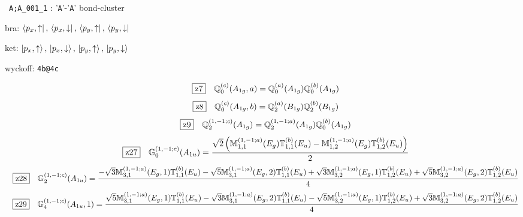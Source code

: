 \documentclass[fleqn,10pt,landscape]{jsarticle}
\begin{document}
\noindent\textbullet\, \texttt{A;A_001_1} : '\texttt{A}'-'\texttt{A}' bond-cluster

\noindent\quad * bra: $\bra{p_{x},\uparrow},\, \bra{p_{x},\downarrow},\, \bra{p_{y},\uparrow},\, \bra{p_{y},\downarrow}$

\noindent\quad * ket: $\ket{p_{x},\uparrow},\, \ket{p_{x},\downarrow},\, \ket{p_{y},\uparrow},\, \ket{p_{y},\downarrow}$

\noindent\quad * wyckoff: \texttt{4b@4c}

\begin{dmath*}
\hspace*{3mm}\fbox{z7}\quad \mathbb{Q}_{0}^{(c)}(A_{1g},a)=\mathbb{Q}_{0}^{(a)}(A_{1g}) \mathbb{Q}_{0}^{(b)}(A_{1g})
\end{dmath*}
\begin{dmath*}
\hspace*{3mm}\fbox{z8}\quad \mathbb{Q}_{0}^{(c)}(A_{1g},b)=\mathbb{Q}_{2}^{(a)}(B_{1g}) \mathbb{Q}_{2}^{(b)}(B_{1g})
\end{dmath*}
\begin{dmath*}
\hspace*{3mm}\fbox{z9}\quad \mathbb{Q}_{2}^{(1,-1;c)}(A_{1g})=\mathbb{Q}_{2}^{(1,-1;a)}(A_{1g}) \mathbb{Q}_{0}^{(b)}(A_{1g})
\end{dmath*}
\begin{dmath*}
\hspace*{3mm}\fbox{z27}\quad \mathbb{G}_{0}^{(1,-1;c)}(A_{1u})=\frac{\sqrt{2} \left(\mathbb{M}_{1,1}^{(1,-1;a)}(E_{g}) \mathbb{T}_{1,1}^{(b)}(E_{u}) - \mathbb{M}_{1,2}^{(1,-1;a)}(E_{g}) \mathbb{T}_{1,2}^{(b)}(E_{u})\right)}{2}
\end{dmath*}
\begin{dmath*}
\hspace*{3mm}\fbox{z28}\quad \mathbb{G}_{2}^{(1,-1;c)}(A_{1u})=\frac{- \sqrt{3} \mathbb{M}_{3,1}^{(1,-1;a)}(E_{g},1) \mathbb{T}_{1,1}^{(b)}(E_{u}) - \sqrt{5} \mathbb{M}_{3,1}^{(1,-1;a)}(E_{g},2) \mathbb{T}_{1,1}^{(b)}(E_{u}) + \sqrt{3} \mathbb{M}_{3,2}^{(1,-1;a)}(E_{g},1) \mathbb{T}_{1,2}^{(b)}(E_{u}) + \sqrt{5} \mathbb{M}_{3,2}^{(1,-1;a)}(E_{g},2) \mathbb{T}_{1,2}^{(b)}(E_{u})}{4}
\end{dmath*}
\begin{dmath*}
\hspace*{3mm}\fbox{z29}\quad \mathbb{G}_{4}^{(1,-1;c)}(A_{1u},1)=\frac{\sqrt{5} \mathbb{M}_{3,1}^{(1,-1;a)}(E_{g},1) \mathbb{T}_{1,1}^{(b)}(E_{u}) - \sqrt{3} \mathbb{M}_{3,1}^{(1,-1;a)}(E_{g},2) \mathbb{T}_{1,1}^{(b)}(E_{u}) - \sqrt{5} \mathbb{M}_{3,2}^{(1,-1;a)}(E_{g},1) \mathbb{T}_{1,2}^{(b)}(E_{u}) + \sqrt{3} \mathbb{M}_{3,2}^{(1,-1;a)}(E_{g},2) \mathbb{T}_{1,2}^{(b)}(E_{u})}{4}
\end{dmath*}
\end{document}
